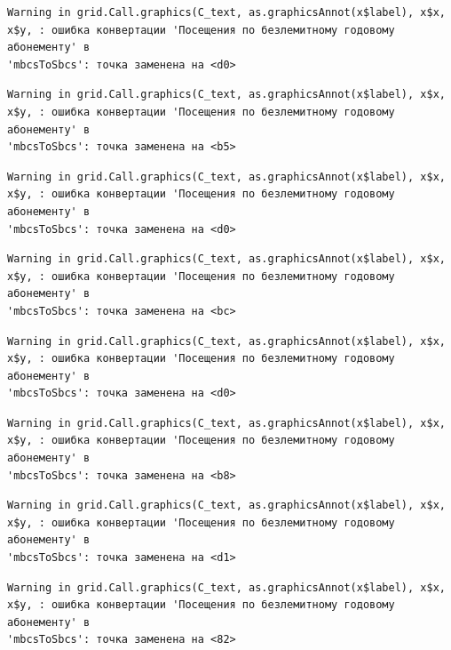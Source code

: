 \documentclass[
  letterpaper,
  DIV=11,
  numbers=noendperiod]{scrreprt}
\begin{document}
\begin{verbatim}
Warning in grid.Call.graphics(C_text, as.graphicsAnnot(x$label), x$x,
x$y, : ошибка конвертации 'Посещения по безлемитному годовому абонементу' в
'mbcsToSbcs': точка заменена на <d0>
\end{verbatim}

\begin{verbatim}
Warning in grid.Call.graphics(C_text, as.graphicsAnnot(x$label), x$x,
x$y, : ошибка конвертации 'Посещения по безлемитному годовому абонементу' в
'mbcsToSbcs': точка заменена на <b5>
\end{verbatim}

\begin{verbatim}
Warning in grid.Call.graphics(C_text, as.graphicsAnnot(x$label), x$x,
x$y, : ошибка конвертации 'Посещения по безлемитному годовому абонементу' в
'mbcsToSbcs': точка заменена на <d0>
\end{verbatim}

\begin{verbatim}
Warning in grid.Call.graphics(C_text, as.graphicsAnnot(x$label), x$x,
x$y, : ошибка конвертации 'Посещения по безлемитному годовому абонементу' в
'mbcsToSbcs': точка заменена на <bc>
\end{verbatim}

\begin{verbatim}
Warning in grid.Call.graphics(C_text, as.graphicsAnnot(x$label), x$x,
x$y, : ошибка конвертации 'Посещения по безлемитному годовому абонементу' в
'mbcsToSbcs': точка заменена на <d0>
\end{verbatim}

\begin{verbatim}
Warning in grid.Call.graphics(C_text, as.graphicsAnnot(x$label), x$x,
x$y, : ошибка конвертации 'Посещения по безлемитному годовому абонементу' в
'mbcsToSbcs': точка заменена на <b8>
\end{verbatim}

\begin{verbatim}
Warning in grid.Call.graphics(C_text, as.graphicsAnnot(x$label), x$x,
x$y, : ошибка конвертации 'Посещения по безлемитному годовому абонементу' в
'mbcsToSbcs': точка заменена на <d1>
\end{verbatim}

\begin{verbatim}
Warning in grid.Call.graphics(C_text, as.graphicsAnnot(x$label), x$x,
x$y, : ошибка конвертации 'Посещения по безлемитному годовому абонементу' в
'mbcsToSbcs': точка заменена на <82>
\end{verbatim}
\end{document}
